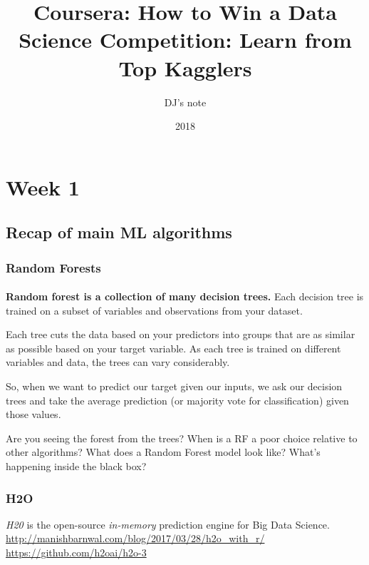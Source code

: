 \documentclass[11pt, twoside]{article}   	%
\title{Coursera: How to Win a Data Science Competition: Learn from Top Kagglers}
\author{DJ's note}
\date{2018}%
\begin{document}
\maketitle %
\tableofcontents %
\pagebreak
\section{Week 1}
\subsection{Recap of main ML algorithms}
\subsubsection{Random Forests}
\paragraph{}
\textbf{Random forest is a collection of many decision trees. }
Each decision tree is trained on a subset of variables and observations from your dataset.

Each tree cuts the data based on your predictors into groups that are as similar as possible based on your target variable. As each tree is trained on different variables and data, the trees can vary considerably.

So, when we want to predict our target given our inputs, we ask our decision trees and take the average prediction (or majority vote for classification) given those values.

Are you seeing the forest from the trees?
When is a RF a poor choice relative to other algorithms? 
What does a Random Forest model look like? What's happening inside the black box? 



\subsubsection{H2O}
\textit{H20} is the open-source \textit{in-memory} prediction engine for Big Data Science.  
\\\url{http://manishbarnwal.com/blog/2017/03/28/h2o_with_r/}
\\\url{https://github.com/h2oai/h2o-3}
\end{document}
